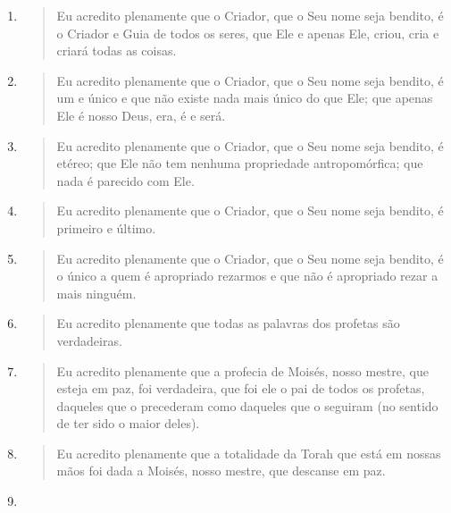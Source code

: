 \begin{enumerate}
\def\labelenumi{\arabic{enumi}.}
\item
  \begin{quote}
  Eu acredito plenamente que o Criador, que o Seu nome seja bendito, é o
  Criador e Guia de todos os seres, que Ele e apenas Ele, criou, cria e
  criará todas as coisas.
  \end{quote}
\item
  \begin{quote}
  Eu acredito plenamente que o Criador, que o Seu nome seja bendito, é
  um e único e que não existe nada mais único do que Ele; que apenas Ele
  é nos­so Deus, era, é e será.
  \end{quote}
\item
  \begin{quote}
  Eu acredito plenamente que o Criador, que o Seu nome seja bendito, é
  eté­reo; que Ele não tem nenhuma propriedade antropomórfica; que nada
  é parecido com Ele.
  \end{quote}
\item
  \begin{quote}
  Eu acredito plenamente que o Criador, que o Seu nome seja bendito, é
  pri­meiro e último.
  \end{quote}
\item
  \begin{quote}
  Eu acredito plenamente que o Criador, que o Seu nome seja bendito, é o
  único a quem é apropriado rezarmos e que não é apropriado rezar a mais
  ninguém.
  \end{quote}
\item
  \begin{quote}
  Eu acredito plenamente que todas as palavras dos profetas são
  verdadeiras.
  \end{quote}
\item
  \begin{quote}
  Eu acredito plenamente que a profecia de Moisés, nosso mestre, que
  esteja em paz, foi verdadeira, que foi ele o pai de todos os profetas,
  daqueles que o precederam como daqueles que o seguiram (no sentido de
  ter sido o maior deles).
  \end{quote}
\item
  \begin{quote}
  Eu acredito plenamente que a totalidade da Torah que está em nossas
  mãos foi dada a Moisés, nosso mestre, que descanse em paz.
  \end{quote}
\item
  \begin{quote}

\end{quote}
\end{enumerate}
